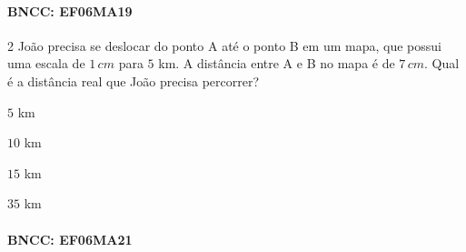 {\paragraph{BNCC: EF06MA19 }


\num{2}  João precisa se deslocar do ponto A até o ponto B em um mapa, que
possui uma escala de $1\,cm$ para $5$ km. A distância entre A e B no mapa é
de $7\,cm$. Qual é a distância real que João precisa percorrer?

\begin{escolha}
\item $5$ km
\item $10$ km
\item $15$ km
\item $35$ km
\end{escolha}

\paragraph{BNCC: EF06MA21 }


}
